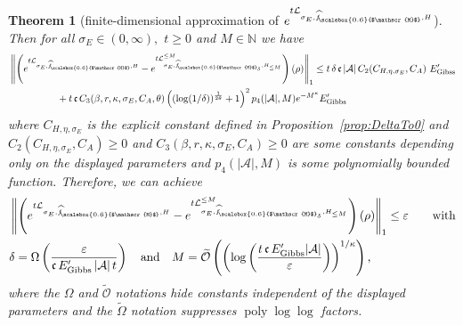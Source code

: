 \documentclass[11pt]{amsart}
\newcommand{\nn}{\nonumber}
\newcommand{\1}{\mathbbm{1}}
\newcommand{\N}{\mathbb{N}}
\newcommand{\cL}{\mathcal{L}}
\newcommand{\eps}{\varepsilon}
\newcommand{\cA}{\mathcal{A}}
\newcommand{\hatfM}{\widehat{f}_{\!\scalebox{0.6}{$\mathscr{M}$}}
}
\newcommand{\hatfMdelta}{\widehat{f}_{\!\scalebox{0.6}{$\mathscr{M}$}_\delta}}
\theoremstyle{plain}
\newtheorem{theorem}{Theorem}[section]
\theoremstyle{definition}
\theoremstyle{remark}
\numberwithin{equation}{section}
\begin{document}
\begin{theorem}[finite-dimensional approximation of $e^{t\cL_{\sigma_E,\hatfM,H}}$]
Then for all $\sigma_E\in(0,\infty),$ $t\ge 0$ and $M\in\N$ we have
    \begin{align}
\nn&\left\|\left(e^{t\cL_{\sigma_E,\hatfM,H}}-e^{t\cL^{\le M}_{\sigma_E,\hatfMdelta,H_{\le M}}}\right)(\rho)\right\|_1\nn\le  t\, \delta \,\mathfrak{c}\, |\cA|\,C_2\!\left(C_{H,\eta,\sigma_E},C_A\right) \, E'_{\operatorname{Gibss}} \\&\qquad\qquad\quad +t\,\mathfrak{c}\,C_3(\beta,r,\kappa,\sigma_E,C_A,\theta) \left((\log(1/\delta))^{\frac{1}{2\theta}} +1\right)^2 p_4(|\mathcal{A}|,M) e^{-M^\kappa} E'_{\operatorname{Gibbs}}
    \end{align}
    where $C_{H,\eta,\sigma_E}$ is the explicit constant defined in Proposition~\ref{prop:DeltaTo0}  and $C_2\!\left(C_{H,\eta,\sigma_E},C_A\right)\ge 0$ and $C_3(\beta,r,\kappa,\sigma_E,C_A)\ge 0$ are some constants depending only on the displayed parameters and $p_4(|\mathcal{A}|,M)$ is some polynomially bounded function. Therefore, we can achieve
    \begin{align}
\nn&\left\|\left(e^{t\cL_{\sigma_E,\hatfM,H}}-e^{t\cL^{\le M}_{\sigma_E,\hatfMdelta,H_{\le M}}}\right)(\rho)\right\|_1 \le \eps\qquad\text{with}\\& \delta=\Omega\left(\frac{\eps}{\mathfrak{c}\,E'_{\operatorname{Gibbs}}\,|\cA|\,t} \right) \quad\text{and}\quad M = \widetilde{\mathcal{O}}\left(\left(\log\left(\frac{t\,\mathfrak{c}\,E'_{\operatorname{Gibbs}}|\cA|}{ \eps}\right)\right)^{1/\kappa}\right),
   \end{align}
    where the $\Omega$ and $\widetilde{\mathcal{O}}$ notations hide constants independent of the displayed parameters and the $\widetilde \Omega$ notation suppresses  $\operatorname{poly}\log\log$ factors.
\end{theorem}
\end{document}
